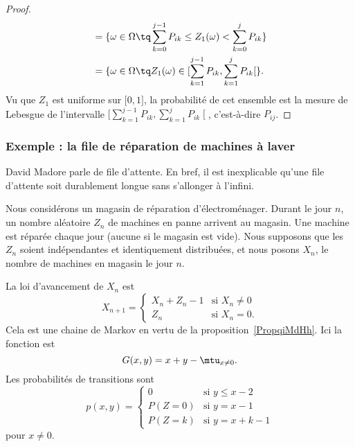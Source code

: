 \begin{proof}
\begin{subequations}
\begin{align}
			                 & =\{ \omega\in\Omega\tq \sum_{k=0}^{j-1}P_{ik}\leq Z_1(\omega)<\sum_{k=0}^{j}P_{ik} \}                                   \\
			                 & =\{ \omega\in\Omega\tq Z_1(\omega)\in\mathopen\lbrack \sum_{k=1}^{j-1}P_{ik} , \sum_{k=1}^jP_{ik} \mathclose\lbrack \}.
		\end{align}
	\end{subequations}
	Vu que \( Z_1\) est uniforme sur \( \mathopen[ 0 , 1 \mathclose]\), la probabilité de cet ensemble est la mesure de Lebesgue de l'intervalle \( \mathopen[ \sum_{k=1}^{j-1}P_{ik} , \sum_{k=1}^jP_{ik} \mathclose[\), c'est-à-dire \( P_{ij}\).
\end{proof}

\subsubsection{Exemple : la file de réparation de machines à laver}

\begin{normaltext}
	David Madore parle de file d'attente\cite{BIBooOSYQooOLuSYF}. En bref, il est inexplicable qu'une file d'attente soit durablement longue sans s'allonger à l'infini.
\end{normaltext}

Nous considérons un magasin de réparation d'électroménager. Durant le jour \( n\), un nombre aléatoire \( Z_{n}\) de machines en panne arrivent au magasin. Une machine est réparée chaque jour (aucune si le magasin est vide). Nous supposons que les \( Z_n\) soient indépendantes et identiquement distribuées, et nous posons \( X_n\), le nombre de machines en magasin le jour \( n\).

La loi d'avancement de \( X_n\) est
\begin{equation}
	X_{n+1}=\begin{cases}
		X_n+Z_n-1 & \text{si } X_n\neq 0 \\
		Z_n       & \text{si } X_n=0.
	\end{cases}
\end{equation}
Cela est une chaine de Markov en vertu de la proposition~\ref{PropqiMdHh}. Ici la fonction est
\begin{equation}
	G(x,y)=x+y-\mtu_{x\neq 0}.
\end{equation}
Les probabilités de transitions sont
\begin{equation}
	p(x,y)=\begin{cases}
		0      & \text{si } y\leq x-2 \\
		P(Z=0) & \text{si } y=x-1     \\
		P(Z=k) & \text{si } y=x+k-1
	\end{cases}
\end{equation}
pour \( x\neq 0\).

